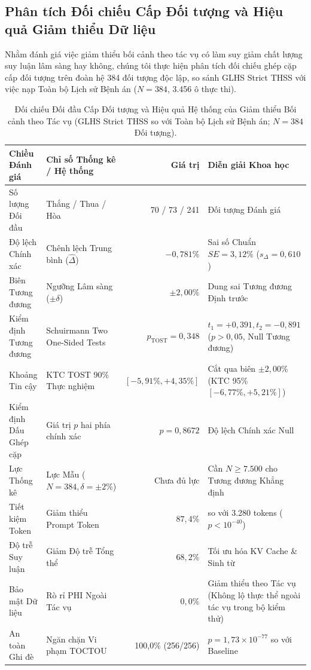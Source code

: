 \documentclass[11pt]{article}
\begin{document}
\subsection{Phân tích Đối chiếu Cấp Đối tượng và Hiệu quả Giảm thiểu Dữ liệu}
Nhằm đánh giá việc giảm thiểu bối cảnh theo tác vụ có làm suy giảm chất lượng suy luận lâm sàng hay không, chúng tôi thực hiện phân tích đối chiếu ghép cặp cấp đối tượng trên đoàn hệ 384 đối tượng độc lập, so sánh GLHS Strict THSS với việc nạp Toàn bộ Lịch sử Bệnh án ($N=384$, 3.456 ô thực thi).

\begin{table}[H]
\centering
\small
\caption{Đối chiếu Đối đầu Cấp Đối tượng và Hiệu quả Hệ thống của Giảm thiểu Bối cảnh theo Tác vụ (GLHS Strict THSS so với Toàn bộ Lịch sử Bệnh án; $N=384$ Đối tượng).}
\label{tab:glhs_tost_equivalence_vi}
\begin{tabularx}{\textwidth}{l l r >{\raggedright\arraybackslash}X}
\toprule
\textbf{Chiều Đánh giá} & \textbf{Chỉ số Thống kê / Hệ thống} & \textbf{Giá trị} & \textbf{Diễn giải Khoa học} \\
\midrule
Số lượng Đối đầu & Thắng / Thua / Hòa & 70 / 73 / 241 & 384 Đối tượng Đánh giá \\
Độ lệch Chính xác & Chênh lệch Trung bình ($\hat{\Delta}$) & $-0{,}781\%$ & Sai số Chuẩn $SE = 3{,}12\%$ ($s_{\Delta} = 0{,}610$) \\
Biên Tương đương & Ngưỡng Lâm sàng ($\pm \delta$) & $\pm 2{,}00\%$ & Dung sai Tương đương Định trước \\
Kiểm định Tương đương & Schuirmann Two One-Sided Tests & $p_{\text{TOST}} = 0{,}348$ & $t_1 = +0{,}391, t_2 = -0{,}891$ ($p > 0{,}05$, Null Tương đương) \\
Khoảng Tin cậy & KTC TOST 90\% Thực nghiệm & $[-5{,}91\%, +4{,}35\%]$ & Cắt qua biên $\pm 2{,}00\%$ (KTC 95\% $[-6{,}77\%, +5{,}21\%]$) \\
Kiểm định Dấu Ghép cặp & Giá trị $p$ hai phía chính xác & $p = 0{,}8672$ & Độ lệch Chính xác Null \\
Lực Thống kê & Lực Mẫu ($N=384, \delta=\pm 2\%$) & Chưa đủ lực & Cần $N \ge 7.500$ cho Tương đương Khẳng định \\
\midrule
Tiết kiệm Token & Giảm thiểu Prompt Token & $87{,}4\%$ & 412 so với 3.280 tokens ($p < 10^{-40}$) \\
Độ trễ Suy luận & Giảm Độ trễ Tổng thể & $68{,}2\%$ & Tối ưu hóa KV Cache \& Sinh từ \\
Bảo mật Dữ liệu & Rò rỉ PHI Ngoài Tác vụ & $0{,}0\%$ & Giảm thiểu theo Tác vụ (Không lộ thực thể ngoài tác vụ trong bộ kiểm thử) \\
An toàn Ghi đè & Ngăn chặn Vi phạm TOCTOU & 100,0\% (256/256) & $p = 1{,}73 \times 10^{-77}$ so với Baseline \\
\bottomrule
\end{tabularx}
\end{table}
\end{document}
